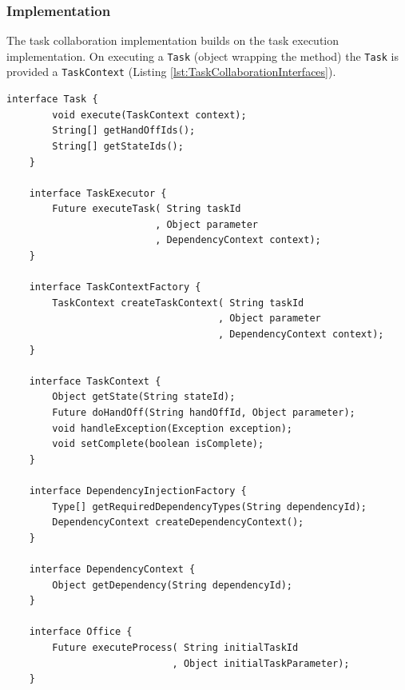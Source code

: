 \documentclass[prodmode]{style/acmlarge}
\begin{document}
\subsubsection*{Implementation}

The task collaboration implementation builds on the task execution
implementation.  On executing a \texttt{Task} (object wrapping the method) the
\texttt{Task} is provided a \texttt{TaskContext} (Listing
\ref{lst:TaskCollaborationInterfaces}).

\lstset{caption=Task collaboration pattern interfaces.}
\begin{lstlisting}[float,label=lst:TaskCollaborationInterfaces]
    interface Task {
        void execute(TaskContext context);
        String[] getHandOffIds();
        String[] getStateIds();
    }

    interface TaskExecutor {
        Future executeTask( String taskId 
                          , Object parameter
                          , DependencyContext context);
    }

    interface TaskContextFactory {
        TaskContext createTaskContext( String taskId
                                     , Object parameter
                                     , DependencyContext context);
    }

    interface TaskContext {
        Object getState(String stateId);
        Future doHandOff(String handOffId, Object parameter);
        void handleException(Exception exception);
        void setComplete(boolean isComplete);
    }

    interface DependencyInjectionFactory {
        Type[] getRequiredDependencyTypes(String dependencyId);
        DependencyContext createDependencyContext();
    }
    
    interface DependencyContext {
        Object getDependency(String dependencyId);
    }

    interface Office {
        Future executeProcess( String initialTaskId
                             , Object initialTaskParameter);
    }
\end{lstlisting}
\end{document}
